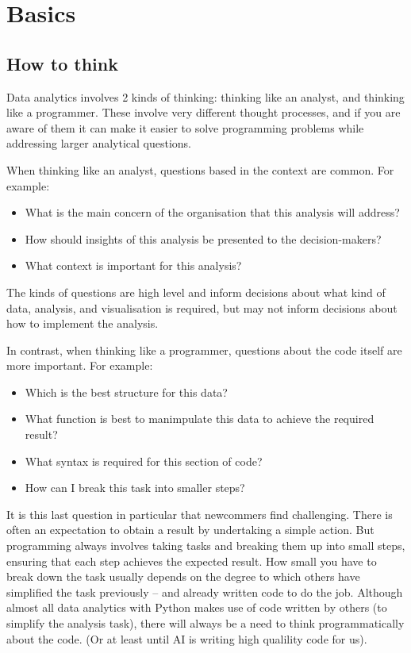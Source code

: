 \chapter{Basics}
\label{chapter:basics}

\section{How to think}

Data analytics involves 2 kinds of thinking: thinking like an analyst, and thinking like a programmer. These involve very different thought processes, and if you are aware of them it can make it easier to solve programming problems while addressing larger analytical questions.

When thinking like an analyst, questions based in the context are common. For example:

\begin{itemize}
    \item What is the main concern of the organisation that this analysis will address?
    \item How should insights of this analysis be presented to the decision-makers?
    \item What context is important for this analysis?
\end{itemize}

The kinds of questions are high level and inform decisions about what kind of data, analysis, and visualisation is required, but may not inform decisions about how to implement the analysis.

In contrast, when thinking like a programmer, questions about the code itself are more important. For example:
\begin{itemize}
    \item Which is the best structure for this data?
    \item What function is best to manimpulate this data to achieve the required result?
    \item What syntax is required for this section of code?
    \item How can I break this task into smaller steps?
\end{itemize}

It is this last question in particular that newcommers find challenging. There is often an expectation to obtain a result by undertaking a simple action. But programming always involves taking tasks and breaking them up into small steps, ensuring that each step achieves the expected result.
How small you have to break down the task usually depends on the degree to which others have simplified the task previously -- and already written code to do the job. Although almost all data analytics with Python makes use of code written by others (to simplify the analysis task), there will always be a need to think programmatically about the code. (Or at least until AI is writing high qualility code for us).

